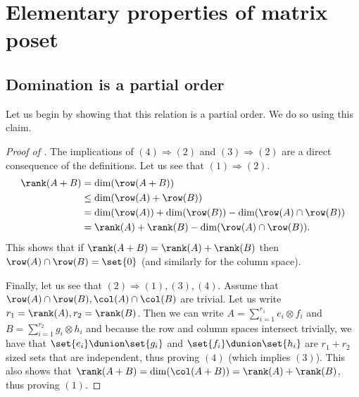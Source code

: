 \section{Elementary properties of matrix poset} \label{app:removing-lower-matrix}
\subsection{Domination is a partial order}
Let us begin by showing that this relation is a partial order. We do so using this claim.

\begin{proof}[Proof of ]
    The implications of \((4) \Rightarrow (2)\) and \((3) \Rightarrow (2)\) are a direct consequence of the definitions. Let us see that \((1) \Rightarrow (2)\).
    \begin{align*}
        \rank(A+B) &= \dim(\row(A+B)) \\
        &\leq \dim(\row(A) + \row(B))\\ 
        &= \dim(\row(A)) + \dim(\row(B)) - \dim(\row(A) \cap \row(B)) \\
        &= \rank(A) + \rank(B) - \dim(\row(A) \cap \row(B)).
    \end{align*}
    This shows that if \(\rank(A+B) = \rank(A) + \rank(B)\) then \(\row(A) \cap \row(B) = \set{0}\) (and similarly for the column space).

    Finally, let us see that \((2) \Rightarrow (1),(3),(4)\). Assume that \(\row(A) \cap \row(B), \col(A) \cap \col(B)\) are trivial. Let us write \(r_1 = \rank(A), r_2 = \rank(B)\). Then we can write \(A = \sum_{i=1}^{r_1} e_i \otimes f_i\) and \(B = \sum_{i=1}^{r_2} g_i \otimes h_i\) and because the row and column spaces intersect trivially, we have that \(\set{e_i} \dunion \set{g_i}\) and \(\set{f_i} \dunion \set{h_i}\) are \(r_1 + r_2\) sized sets that are independent, thus proving \((4)\) (which implies \((3)\)). This also shows that \(\rank(A+B) = \dim(\col(A+B)) = \rank(A)+\rank(B)\), thus proving \((1)\).
    
\end{proof}


